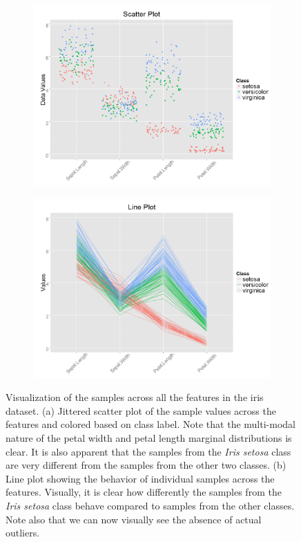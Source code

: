 \documentclass[twoside,leqno,twocolumn]{article}
\begin{document}
\begin{figure}[t!]
	\centering
	\begin{subfigure}[t]{0.48\textwidth}
		\includegraphics[width=\textwidth,valign=t]{Figures/Iris/ScatterColor.png}
		\subcaption{}
		\label{fig:FigScatter}
	\end{subfigure}
	\begin{subfigure}[t]{0.48\textwidth}
		\includegraphics[width=\textwidth,valign=t]{Figures/Iris/LineColor.png}
		\subcaption{}
		\label{fig:FigLine}
	\end{subfigure}
	\caption{Visualization of the samples across all the features in the iris dataset. (a) Jittered scatter plot of the sample values across the features and colored based on class label. Note that the multi-modal nature of the petal width and petal length marginal distributions is clear. It is also apparent that the samples from the \textit{Iris setosa} class are very different from the samples from the other two classes. (b) Line plot showing the behavior of individual samples across the features. Visually, it is clear how differently the samples from the \textit{Iris setosa} class behave compared to samples from the other classes. Note also that we can now visually see the absence of actual outliers.}
	\label{fig:FigFeature}
\end{figure}
\end{document}
